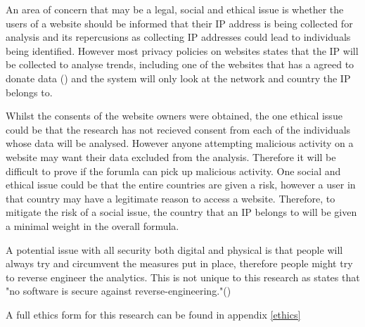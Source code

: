 
An area of concern that may be a legal, social and ethical issue is whether the users of a website should be informed that their IP address is being collected for analysis and its repercusions as collecting IP addresses could lead to individuals being identified. However most privacy policies on websites states that the IP will be collected to analyse trends, including one of the websites that has a agreed to donate data (\cite{PetersWebPrivacy}) and the system will only look at the network and country the IP belongs to.


Whilst the  consents of the website owners were obtained, the one ethical issue could be that the research has not recieved consent from each of the individuals whose data will be analysed. However anyone attempting malicious activity on a website may want their data excluded from the analysis. Therefore it will be difficult to prove if the forumla can pick up malicious activity. One social and ethical issue could be that the entire countries are given a risk, however a user in that country may have a legitimate reason to access a website. Therefore, to mitigate the risk of a social issue, the country that an IP belongs to will be given a minimal weight in the overall formula. 

A potential issue with all security both digital and physical is that people will always try and circumvent the measures put in place, therefore people might try to reverse engineer the analytics. This is not unique to this research as \citeauthor{708447} states that "no software is secure against reverse-engineering."(\cite{708447})

A full ethics form for this research can be found in appendix \ref{ethics}

